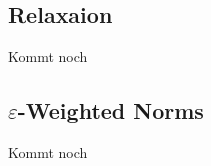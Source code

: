 \documentclass[12pt,ngerman]{article}
\begin{document}
\subsection{Relaxaion}
Kommt noch 

\subsection{$\varepsilon$-Weighted Norms}
Kommt noch 













	
	
	
	
	
	
	
		
	
\end{document}
